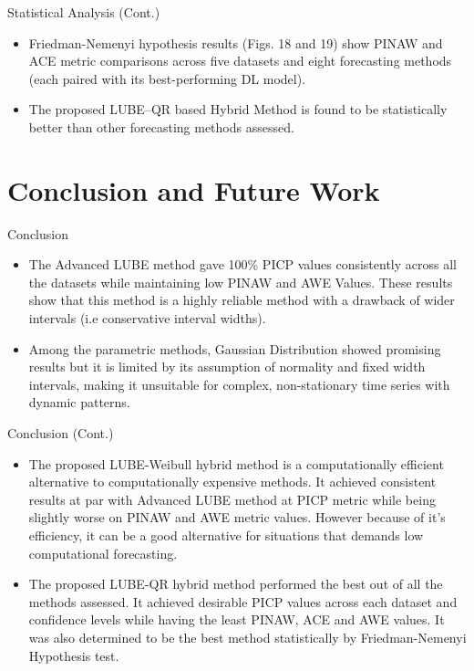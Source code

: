 \documentclass[xcolor=dvipsnames,aspectratio=169]{beamer}
\begin{document}
\begin{frame}{Statistical Analysis (Cont.)}
\begin{itemize}
    \item Friedman-Nemenyi hypothesis results (Figs. 18 and 19) show PINAW and ACE metric comparisons across five datasets and eight forecasting methods (each paired with its best-performing DL model).
    \item The proposed LUBE–QR based Hybrid Method is found to be statistically better than other forecasting methods assessed.
\end{itemize}
    
\end{frame}

\section{Conclusion and Future Work}

\begin{frame}{Conclusion}

\begin{itemize}
\item The Advanced LUBE method gave 100\% PICP values consistently across all the datasets while maintaining low PINAW and AWE Values. These results show that this method is a highly reliable method with a drawback of wider intervals (i.e conservative interval widths). 

\item Among the parametric methods, Gaussian Distribution showed promising results but it is limited by its assumption of normality and fixed width intervals, making it unsuitable for complex, non-stationary time series with dynamic patterns.
\end{itemize}
\end{frame}

\begin{frame}{Conclusion (Cont.)}
    \begin{itemize}

        \item The proposed LUBE-Weibull hybrid method is a computationally efficient alternative to computationally expensive methods. It achieved consistent results at par with Advanced LUBE method at PICP metric while being slightly worse on PINAW and AWE metric values. However because of it's efficiency, it can be a good alternative for situations that demands low computational forecasting.
        
        \item The proposed LUBE-QR hybrid method performed the best out of all the methods assessed. It achieved desirable PICP values across each dataset and confidence levels while having the least PINAW, ACE and AWE values. It was also determined to be the best method statistically by Friedman-Nemenyi Hypothesis test.
    \end{itemize}
\end{frame}
\end{document}
